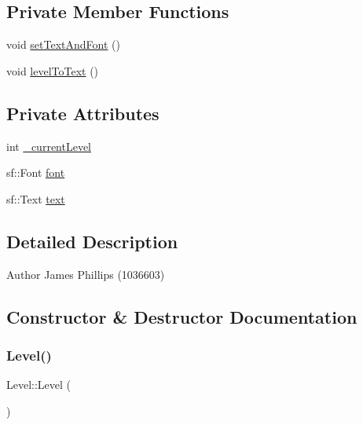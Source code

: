 \subsection*{Private Member Functions}
\begin{DoxyCompactItemize}
\item 
void \hyperlink{class_level_aa726d09473bbb551477994c70e516a99}{set\+Text\+And\+Font} ()
\item 
void \hyperlink{class_level_a0d5d67c406bf3ee9eb5be34718345b40}{level\+To\+Text} ()
\end{DoxyCompactItemize}
\subsection*{Private Attributes}
\begin{DoxyCompactItemize}
\item 
int \hyperlink{class_level_a70f3892ab0296e9ab92798b62d1dc894}{\+\_\+current\+Level}
\item 
sf\+::\+Font \hyperlink{class_level_af8ac9bfc42fb1b12b12538e2b9c170e7}{font}
\item 
sf\+::\+Text \hyperlink{class_level_a4f0d652d48634a83436f314c0581ac23}{text}
\end{DoxyCompactItemize}


\subsection{Detailed Description}
\begin{DoxyAuthor}{Author}
James Phillips (1036603) 
\end{DoxyAuthor}


\subsection{Constructor \& Destructor Documentation}
\mbox{\label{class_level_a7a696c928ca5d5354db6e50e46d0f67d}} 
\subsubsection{\texorpdfstring{Level()}{Level()}}
{\footnotesize\ttfamily Level\+::\+Level (\begin{DoxyParamCaption}{ }\end{DoxyParamCaption})}



